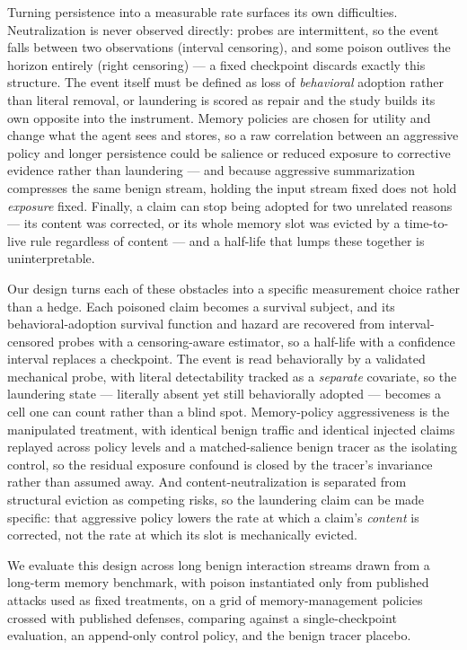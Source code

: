 \documentclass[11pt]{article}
\begin{document}
Turning persistence into a measurable rate surfaces its own difficulties. Neutralization is never observed directly: probes are intermittent, so the event falls between two observations (interval censoring), and some poison outlives the horizon entirely (right censoring) --- a fixed checkpoint discards exactly this structure. The event itself must be defined as loss of \emph{behavioral} adoption rather than literal removal, or laundering is scored as repair and the study builds its own opposite into the instrument. Memory policies are chosen for utility and change what the agent sees and stores, so a raw correlation between an aggressive policy and longer persistence could be salience or reduced exposure to corrective evidence rather than laundering --- and because aggressive summarization compresses the same benign stream, holding the input stream fixed does not hold \emph{exposure} fixed. Finally, a claim can stop being adopted for two unrelated reasons --- its content was corrected, or its whole memory slot was evicted by a time-to-live rule regardless of content --- and a half-life that lumps these together is uninterpretable.

Our design turns each of these obstacles into a specific measurement choice rather than a hedge. Each poisoned claim becomes a survival subject, and its behavioral-adoption survival function and hazard are recovered from interval-censored probes with a censoring-aware estimator, so a half-life with a confidence interval replaces a checkpoint. The event is read behaviorally by a validated mechanical probe, with literal detectability tracked as a \emph{separate} covariate, so the laundering state --- literally absent yet still behaviorally adopted --- becomes a cell one can count rather than a blind spot. Memory-policy aggressiveness is the manipulated treatment, with identical benign traffic and identical injected claims replayed across policy levels and a matched-salience benign tracer as the isolating control, so the residual exposure confound is closed by the tracer's invariance rather than assumed away. And content-neutralization is separated from structural eviction as competing risks, so the laundering claim can be made specific: that aggressive policy lowers the rate at which a claim's \emph{content} is corrected, not the rate at which its slot is mechanically evicted.

We evaluate this design across long benign interaction streams drawn from a long-term memory benchmark, with poison instantiated only from published attacks used as fixed treatments, on a grid of memory-management policies crossed with published defenses, comparing against a single-checkpoint evaluation, an append-only control policy, and the benign tracer placebo.
\end{document}
